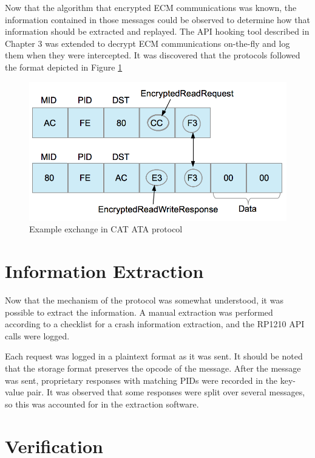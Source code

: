 Now that the algorithm that encrypted ECM communications was known, the information contained in those
messages could be observed to determine how that information should be extracted and replayed. The
API hooking tool described in Chapter 3 was extended to decrypt ECM communications on-the-fly
and log them when they were intercepted. It was discovered that the protocols followed the format depicted
in Figure \ref{fig:ataprotocol}

\begin{figure}[h]
  \centering
  \includegraphics[scale=0.75]{cat-protocol-diagram}
  \caption{Example exchange in CAT ATA protocol}
  \label{fig:ataprotocol}
\end{figure}

\section{Information Extraction}

Now that the mechanism of the protocol was somewhat understood, it was possible to extract the information.
A manual extraction was performed according to a checklist for a crash information extraction, and the 
RP1210 API calls were logged.

Each request was logged in a plaintext format as it was sent. 
It should be noted that the storage format preserves the opcode of the message. After the message was sent, proprietary
responses with matching PIDs were recorded in the key-value pair. It was observed that some responses were split over
several messages, so this was accounted for in the extraction software.

\section{Verification}

